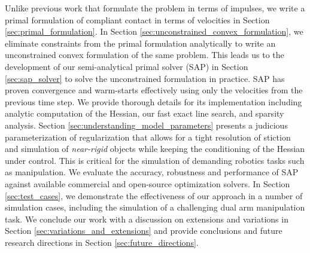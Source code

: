 Unlike previous work \cite{bib:anitescu2010,bib:todorov2014} that formulate the
problem in terms of impulses, we write a primal formulation of compliant contact
in terms of velocities in Section \ref{sec:primal_formulation}. In Section
\ref{sec:unconstrained_convex_formulation}, we eliminate constraints from the
primal formulation analytically to write an unconstrained convex formulation of
the same problem. This leads us to the development of our semi-analytical primal
solver (SAP) in Section \ref{sec:sap_solver} to solve the unconstrained
formulation in practice. SAP has proven convergence and warm-starts effectively
using only the velocities from the previous time step. We provide thorough
details for its implementation including analytic computation of the Hessian,
our fast exact line search, and sparsity analysis. Section
\ref{sec:understanding_model_parameters} presents a judicious parameterization
of regularization that allows for a tight resolution of stiction and simulation
of \emph{near-rigid} objects while keeping the conditioning of the Hessian under
control. This is critical for the simulation of demanding robotics tasks such as
manipulation. We evaluate the accuracy, robustness and performance of SAP
against available commercial and open-source optimization solvers. In Section
\ref{sec:test_cases}, we demonstrate the effectiveness of our approach in a
number of simulation cases, including the simulation of a challenging dual arm
manipulation task. We conclude our work with a discussion on extensions and
variations in Section \ref{sec:variations_and_extensions} and provide
conclusions and future research directions in Section
\ref{sec:future_directions}.
